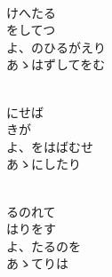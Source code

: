 \documentclass[10pt,b5j]{tarticle} %
\begin{document}
\vspace{1.5em} %
\newcommand{\linespace}{0.5em} %
\newcommand{\blocksize}{0.5\hsize} %
\newcommand{\itemmargin}{3em} %
\begin{enumerate} %
    \setlength{\itemindent}{\itemmargin} %
    \begin{minipage}[c]{\blocksize}
    
        \vspace{\linespace}
        \item~\\
        けへたる\\
        をしてつ\\
        よ、のひるがえり\\
        あゝはずしてをむ
        
    \end{minipage}
    \begin{minipage}[c]{\blocksize}
        
        \vspace{\linespace}
        \item~\\
        にせば\\
        きが\\
        よ、をはばむせ\\
        あゝにしたり
        
    \end{minipage}
    \begin{minipage}[c]{\blocksize}
        
        \vspace{\linespace}
        \item~\\
        るのれて\\
        はりをす\\
        よ、たるのを\\
        あゝてりは
    
    \end{minipage}
\end{enumerate} %
\end{document}
